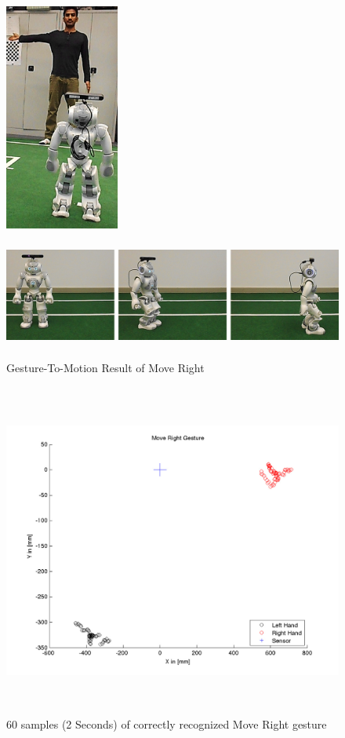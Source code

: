 \begin{figure}
	[h] 
	\begin{minipage}
		{1 
		\textwidth} \centering 
		\includegraphics[height=75mm]{figures/result/usr-move-right.jpg} \caption*{} 
	\end{minipage}
	\begin{minipage}
		{1 
		\textwidth} 
		\includegraphics[height=42mm]{figures/result/nao-gm-move-right.jpg} 
	\end{minipage}
	\caption{Gesture-To-Motion Result of Move Right} \label{res:gm:move:right} 
\end{figure}
\begin{figure}
	[h] \centering 
	\includegraphics[height=110mm]{figures/result/test-move-right.jpg} \caption{60 samples (2 Seconds) of correctly recognized Move Right gesture}
	\label{res:pl:move:right}  
\end{figure}
